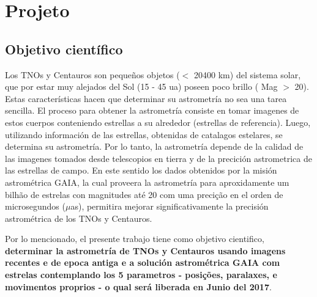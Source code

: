 \documentclass[a4paper, 11pt]{article}
\begin{document}
\renewcommand{\figurename}{\textsc{Figura}}
\renewcommand{\tablename}{\textsc{Tabela}}
\renewcommand{\refname}{Refer\^encias}




\section{Projeto}

\subsection{Objetivo científico}

Los TNOs y Centauros son pequeños objetos ($<$ 20400 km) del sistema solar, que por estar muy alejados del Sol (15 - 45 ua) poseen poco brillo ( Mag $>$ 20). Estas características hacen que determinar su astrometría no sea una tarea sencilla. El proceso para obtener la astrometría consiste en tomar imagenes de estos cuerpos conteniendo estrellas a su alrededor (estrellas de referencia). Luego, utilizando información de las estrellas, obtenidas de catalagos estelares, se determina su astrometría. Por lo tanto, la astrometría depende de la calidad de las imagenes tomados desde telescopios en tierra y de la precición astrometrica de las estrellas de campo. En este sentido los dados obtenidos por la misión astrométrica GAIA, la cual proveera la astrometría para aproxidamente um bilhão de estrelas con magnitudes até 20 com uma precição en el orden de microsegundos ($\mu$as), permitira mejorar significativamente la precisión astrométrica de  los TNOs y Centauros.

Por lo mencionado, el presente trabajo tiene como objetivo cientifico, \textbf{determinar la astrometría de TNOs y Centauros usando imagens recentes e de epoca antiga e a solución astrométrica GAIA com estrelas contemplando los 5 parametros - posições, paralaxes, e movimentos proprios - o qual será liberada en Junio del 2017}.
\end{document}
